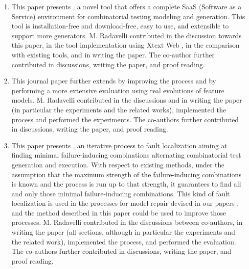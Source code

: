\begin{enumerate}
	\item \cite{IWCTGargantini2018} 
	
	This paper presents \ctwedge, a novel tool that offers a complete SaaS (Software as a Service) environment for combinatorial testing modeling and generation. This tool is installation-free and download-free, easy to use, and extensible to support more generators.
	M. Radavelli contributed in the discussion towards this paper, in the tool implementation using Xtext Web \cite{Eysholdt:2010,xtext}, in the comparison with existing tools, and in writing the paper.
	The co-author further contributed in discussions, writing the paper, and proof reading.

	\item \cite{arcaini2019achieving} 	
	
	This journal paper further extends \cite{arcaini_evolutionary_2018} by improving the process and by performing a more extensive evaluation using real evolutions of feature models.
	M. Radavelli contributed in the discussions and in writing the paper (in particular the experiments and the related works), implemented the process and performed the experiments.
	The co-authors further contributed in discussions, writing the paper, and proof reading.
	
	\item \cite{iwct19} 

	This paper presents \mix, an iterative process to fault localization aiming at finding minimal failure-inducing combinations alternating combinatorial test generation and execution. With respect to existing methods, under the assumption that the maximum strength of the failure-inducing combinations is known and the process is run up to that strength, it guarantees to find all and only those minimal failure-inducing combinations.
	This kind of fault localization is used in the processes for model repair devised in our papers \cite{gargantini_combinatorial_2017,IWCTGargantini2018,garn2019}, and the method
	described in this paper could be used to improve those processes.
	M. Radavelli contributed in the discussions between co-authors, in writing the paper (all sections, although in particular the experiments and the related work), implemented the process, and performed the evaluation.
	The co-authors further contributed in discussions, writing the paper, and proof reading.
	
	
		

\end{enumerate}
